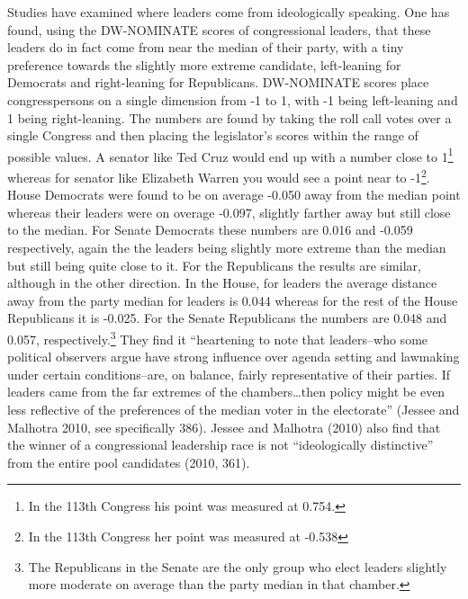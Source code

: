 \documentclass[12pt,twoside]{reedthesis}
\begin{document}
  Studies have examined where leaders come from ideologically speaking.
  One has found, using the DW-NOMINATE scores of congressional leaders,
  that these leaders do in fact come from near the median of their party,
  with a tiny preference towards the slightly more extreme candidate,
  left-leaning for Democrats and right-leaning for Republicans.
  DW-NOMINATE scores place congresspersons on a single dimension from -1
  to 1, with -1 being left-leaning and 1 being right-leaning. The numbers
  are found by taking the roll call votes over a single Congress and then
  placing the legislator's scores within the range of possible values. A
  senator like Ted Cruz would end up with a number close to 1\footnote{In
    the 113th Congress his point was measured at 0.754.} whereas for
  senator like Elizabeth Warren you would see a point near to -1\footnote{In
    the 113th Congress her point was measured at -0.538}. House Democrats
  were found to be on average -0.050 away from the median point whereas
  their leaders were on overage -0.097, slightly farther away but still
  close to the median. For Senate Democrats these numbers are 0.016 and
  -0.059 respectively, again the the leaders being slightly more extreme
  than the median but still being quite close to it. For the Republicans
  the results are similar, although in the other direction. In the House,
  for leaders the average distance away from the party median for leaders
  is 0.044 whereas for the rest of the House Republicans it is -0.025. For
  the Senate Republicans the numbers are 0.048 and 0.057,
  respectively.\footnote{The Republicans in the Senate are the only group
    who elect leaders slightly more moderate on average than the party
    median in that chamber.} They find it ``heartening to note that
  leaders--who some political observers argue have strong influence over
  agenda setting and lawmaking under certain conditions--are, on balance,
  fairly representative of their parties. If leaders came from the far
  extremes of the chambers\ldots{}then policy might be even less
  reflective of the preferences of the median voter in the electorate''
  (Jessee and Malhotra 2010, see specifically 386). Jessee and Malhotra
  (2010) also find that the winner of a congressional leadership race is
  not ``ideologically distinctive'' from the entire pool candidates (2010,
  361).
  
\end{document}
